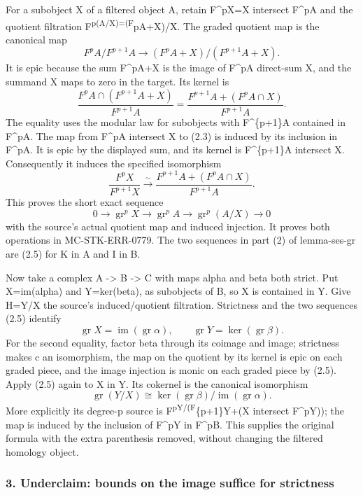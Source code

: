 \documentclass[11pt]{article}
\begin{document}
For a subobject X of a filtered object A, retain F\^{}pX=X intersect F\^{}pA and the quotient filtration F\textsuperscript{p(A/X)=(F}pA+X)/X. The graded quotient map is the canonical map \[
F^pA/F^{p+1}A
\longrightarrow
(F^pA+X)/(F^{p+1}A+X).                                    \tag{2.2}
\] It is epic because the sum F\^{}pA+X is the image of F\^{}pA direct-sum X, and the summand X maps to zero in the target. Its kernel is \[
\frac{F^pA\cap(F^{p+1}A+X)}{F^{p+1}A}
=\frac{F^{p+1}A+(F^pA\cap X)}{F^{p+1}A}.                  \tag{2.3}
\] The equality uses the modular law for subobjects with F\^{}\{p+1\}A contained in F\^{}pA. The map from F\^{}pA intersect X to (2.3) is induced by its inclusion in F\^{}pA. It is epic by the displayed sum, and its kernel is F\^{}\{p+1\}A intersect X. Consequently it induces the specified isomorphism \[
\frac{F^pX}{F^{p+1}X}
\xrightarrow{\ \sim\ }
\frac{F^{p+1}A+(F^pA\cap X)}{F^{p+1}A}.                    \tag{2.4}
\] This proves the short exact sequence \[
0\longrightarrow\operatorname{gr}^pX
\longrightarrow\operatorname{gr}^pA
\longrightarrow\operatorname{gr}^p(A/X)\longrightarrow0
                                                               \tag{2.5}
\] with the source's actual quotient map and induced injection. It proves both operations in MC-STK-ERR-0779. The two sequences in part (2) of lemma-ses-gr are (2.5) for K in A and I in B.

Now take a complex A -\textgreater{} B -\textgreater{} C with maps alpha and beta both strict. Put X=im(alpha) and Y=ker(beta), as subobjects of B, so X is contained in Y. Give H=Y/X the source's induced/quotient filtration. Strictness and the two sequences (2.5) identify \[
\operatorname{gr}X=\operatorname{im}(\operatorname{gr}\alpha),
\qquad
\operatorname{gr}Y=\ker(\operatorname{gr}\beta).
\] For the second equality, factor beta through its coimage and image; strictness makes c an isomorphism, the map on the quotient by its kernel is epic on each graded piece, and the image injection is monic on each graded piece by (2.5). Apply (2.5) again to X in Y. Its cokernel is the canonical isomorphism \[
\operatorname{gr}(Y/X)
\cong
\ker(\operatorname{gr}\beta)/
\operatorname{im}(\operatorname{gr}\alpha).                \tag{2.6}
\] More explicitly its degree-p source is F\textsuperscript{pY/(F}\{p+1\}Y+(X intersect F\^{}pY)); the map is induced by the inclusion of F\^{}pY in F\^{}pB. This supplies the original formula with the extra parenthesis removed, without changing the filtered homology object.

\subsubsection{3. Underclaim: bounds on the image suffice for strictness}\label{underclaim-bounds-on-the-image-suffice-for-strictness}
\end{document}
